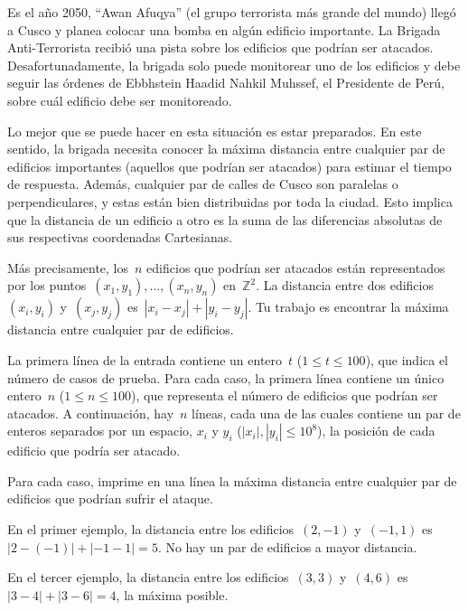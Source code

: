
Es el año 2050, ``Awan Afuqya'' (el grupo terrorista más grande del mundo) llegó a
Cusco y planea colocar una bomba en algún edificio importante. La Brigada
Anti-Terrorista recibió una pista sobre los edificios que podrían ser
atacados. Desafortunadamente, la brigada solo puede monitorear uno de los edificios y
debe seguir las órdenes de Ebbhstein Haadid Nahkil Muhssef, el Presidente de Perú,
sobre cuál edificio debe ser monitoreado.

Lo mejor que se puede hacer en esta situación es estar preparados. En este sentido,
la brigada necesita conocer la máxima distancia entre cualquier par de edificios
importantes (aquellos que podrían ser atacados) para estimar el tiempo de
respuesta. Además, cualquier par de calles de Cusco son paralelas o perpendiculares,
y estas están bien distribuidas por toda la ciudad. Esto implica que la distancia de
un edificio a otro es la suma de las diferencias absolutas de sus respectivas
coordenadas Cartesianas.

Más precisamente, los~$n$ edificios que podrían ser atacados están representados por
los puntos~$(x_1, y_1), \dots, (x_n, y_n)$ en~$\mathbb{Z}^2$. La distancia entre dos
edificios~$(x_i, y_i)$ y~$(x_j, y_j)$ es~$|x_i - x_j| + |y_i - y_j|$. Tu trabajo es
encontrar la máxima distancia entre cualquier par de edificios.


La primera línea de la entrada contiene un entero~$t$ ($1 \leq t \leq 100$), que indica el
número de casos de prueba. Para cada caso, la primera línea contiene un único
entero~$n$ ($1 \leq n \leq 100$), que representa el número de edificios que podrían ser
atacados. A continuación, hay~$n$ líneas, cada una de las cuales contiene un par de
enteros separados por un espacio, $x_i$ y $y_i$ ($|x_i|, |y_i| \leq 10^8$), la posición
de cada edificio que podría ser atacado.

\outputText

Para cada caso, imprime en una línea la máxima distancia entre cualquier par de
edificios que podrían sufrir el ataque.

\exampleCases

\begin{example}
\end{example}

\explanationText

En el primer ejemplo, la distancia entre los edificios~$(2, -1)$ y~$(-1, 1)$
es~$|2 - (- 1)| + |-1 - 1| = 5$. No hay un par de edificios a mayor distancia.

En el tercer ejemplo, la distancia entre los edificios~$(3, 3)$ y~$(4, 6)$
es~$|3 - 4| + |3 - 6| = 4$, la máxima posible.
